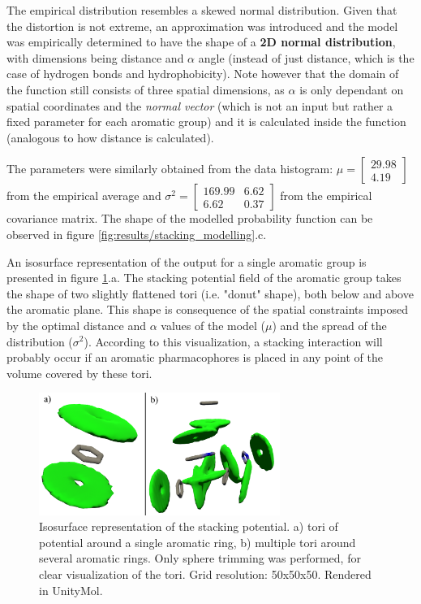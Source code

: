       The empirical distribution resembles a skewed normal distribution. Given that the distortion is not extreme, an approximation was introduced and the model was empirically determined to have the shape of a \textbf{2D normal distribution}, with dimensions being distance and $\alpha$ angle (instead of just distance, which is the case of hydrogen bonds and hydrophobicity). Note however that the domain of the function still consists of three spatial dimensions, as $\alpha$ is only dependant on spatial coordinates and the \textit{normal vector} (which is not an input but rather a fixed parameter for each aromatic group) and it is calculated inside the function (analogous to how distance is calculated).

      The parameters were similarly obtained from the data histogram: $\mu = \begin{bmatrix} 29.98 \\ 4.19 \end{bmatrix}$ from the empirical average and $\sigma^2 = \begin{bmatrix} 169.99 & 6.62 \\ 6.62 & 0.37 \end{bmatrix}$ from the empirical covariance matrix. The shape of the modelled probability function can be observed in figure \ref{fig:results/stacking_modelling}.c.

      An isosurface representation of the output for a single aromatic group is presented in figure \ref{fig:results/visualize_stacking}.a. The stacking potential field of the aromatic group takes the shape of two slightly flattened tori (i.e. "donut" shape), both below and above the aromatic plane. This shape is consequence of the spatial constraints imposed by the optimal distance and $\alpha$ values of the model ($\mu$) and the spread of the distribution ($\sigma^2$). According to this visualization, a stacking interaction will probably occur if an aromatic pharmacophores is placed in any point of the volume covered by these tori.

      \begin{figure}[H]
        \centering
        \includegraphics[width=0.7\textwidth]{figures/results/visualize_stacking.png}
        \caption{\label{fig:results/visualize_stacking} Isosurface representation of the stacking potential. a) tori of potential around a single aromatic ring, b) multiple tori around several aromatic rings. Only sphere trimming was performed, for clear visualization of the tori. Grid resolution: 50x50x50. Rendered in UnityMol.}
      \end{figure}

